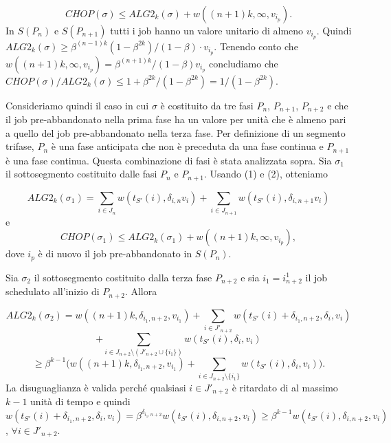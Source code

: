 \documentclass[twoside,openany,titlepage,fleqn,
	headinclude,12pt,a4paper,BCOR5mm,footinclude]{scrbook}
\begin{document}
\begin{equation}
CHOP (\sigma) \leq ALG2_{k} (\sigma) + w((n + 1) k, \infty, v_{i_{p}}). \tag*{(2)}
\end{equation}
In $S(P_{n})$ e $S(P_{n+1})$ tutti i job hanno un valore unitario di almeno $v_{i_{p}}$. Quindi $ALG2_{k} (\sigma) \geq \beta^{(n - 1)k}(1 - \beta^{2k}) / (1 - \beta) \cdot v_{i_{p}}$. Tenendo conto che $w ((n +1) k, \infty, v_{i_{p}}) = \beta^{(n + 1) k} / (1 - \beta) v_{i_{p}}$ concludiamo che $CHOP(\sigma) / ALG2_{k}(\sigma) \leq 1 + \beta^{2k} / (1 - \beta^{2k}) = 1 / (1 - \beta^{2k})$.

Consideriamo quindi il caso in cui $\sigma$ è costituito da tre fasi $P_{n}$, $P_{n+1}$, $P_{n+2}$ e che il job pre-abbandonato nella prima fase ha un valore per unità che è almeno pari a quello del job pre-abbandonato nella terza fase. Per definizione di un segmento trifase, $P_{n}$ è una fase anticipata che non è preceduta da una fase continua e $P_{n+1}$ è una fase continua. Questa combinazione di fasi è stata analizzata sopra. Sia $\sigma_{1}$ il sottosegmento costituito dalle fasi $P_{n}$ e $P_{n+1}$. Usando (1) e (2), otteniamo

$$ALG2_{k} (\sigma_{1}) = \sum_{i \in J_{n}} w(t_{S'}(i), \delta_{i, n}v_{i}) + \sum_{i\in J_{n+1}} w (t_{S'}(i), \delta_{i, n + 1} v_{i})$$
e
\begin{equation}
CHOP (\sigma_{1}) \leq ALG2_{k} (\sigma_{1}) + w ((n + 1) k, \infty, v_{i_{p}}), \tag*{(3)}
\end{equation}
dove $i_{p}$ è di nuovo il job pre-abbandonato in $S (P_{n})$.

Sia $\sigma_{2}$ il sottosegmento costituito dalla terza fase $P_{n+2}$ e sia $i_{1} = i^{1}_{n+2}$ il job schedulato all'inizio di $P_{n+2}$. Allora

$$ALG2_{k} (\sigma_{2}) = w ((n + 1) k, \delta_{i_{1}, n + 2}, v_{i_{1}}) + \sum_{i \in J'_{n+2}} w(t_{S'}(i) + \delta_{i_{1}, n+2}, \delta_{i}, v_{i})$$
$$+ \sum_{i \in J_{n + 2} \setminus (J'_{n + 2} \cup \{i_{1}\})} w(t_{S'}(i), \delta_{i}, v_{i})$$
$$\geq \beta^{k - 1}\Bigg( w((n + 1) k, \delta_{i_{1},n+2}, v_{i_{1}}) + \sum_{i \in J_{n + 2} \setminus \{i_{1}\}} w(t_{S'}(i), \delta_{i}, v_{i}) \Bigg).$$
La disuguaglianza è valida perché qualsiasi $i \in J'_{n+2}$ è ritardato di al massimo $k - 1$
unità di tempo e quindi $w(t_{S'}(i) + \delta_{i_{1}, n + 2}, \delta_{i}, v_{i}) = \beta^{\delta_{i_{1}, n + 2}} w (t_{S'}(i), \delta_{i, n + 2}, v_{i}) \geq \beta^{k - 1}w (t_{S'}(i) , \delta_{i, n + 2}, v_{i})$, $\forall i \in J'_{n+2}$.
\end{document}
